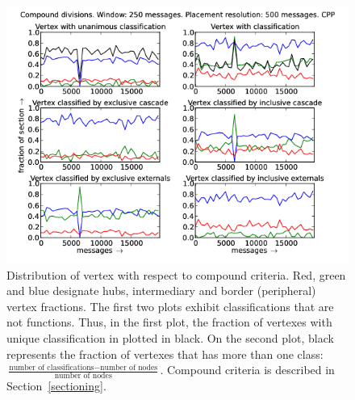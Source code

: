 \documentclass[%
 aip,
 jmp,%
 amsmath,amssymb,
 reprint,%
]{revtex4-1}
\begin{document}
\begin{figure}[hbtp] 
   \centering
        \includegraphics[width=\textwidth]{figs/CPP/250_2}
    \caption{Distribution of vertex with respect to compound criteria. Red, green and blue designate hubs, intermediary and border (peripheral) vertex fractions. The first two plots exhibit classifications that are not functions. Thus, in the first plot, the fraction of vertexes with unique classification in plotted in black. On the second plot, black represents the fraction of vertexes that has more than one class: $\frac{\text{number of classifications} - \text{number of nodes}}{\text{number of nodes}}$. Compound criteria is described in Section~\ref{sectioning}.}
    \label{fig:cpp250_}
\end{figure}
\end{document}
